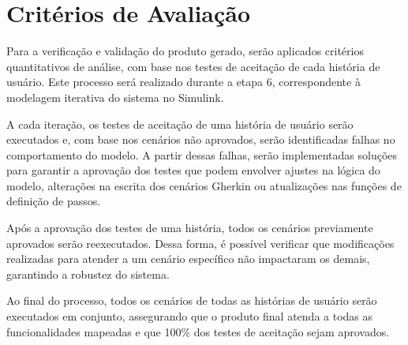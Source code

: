 \section{\textbf{Critérios de Avaliação}}
Para a verificação e validação do produto gerado, serão aplicados critérios quantitativos de análise, com base nos testes de aceitação de cada história de usuário. Este 
processo será realizado durante a etapa 6, correspondente à modelagem iterativa do sistema no Simulink.

A cada iteração, os testes de aceitação de uma história de usuário serão executados e, com base nos cenários não aprovados, serão identificadas falhas no comportamento 
do modelo. A partir dessas falhas, serão implementadas soluções para garantir a aprovação dos testes que podem envolver ajustes na lógica do modelo, 
alterações na escrita dos cenários Gherkin ou atualizações nas funções de definição de passos.

Após a aprovação dos testes de uma história, todos os cenários previamente aprovados serão reexecutados. Dessa forma, é possível verificar que modificações realizadas 
para atender a um cenário específico não impactaram os demais, garantindo a robustez do sistema.

Ao final do processo, todos os cenários de todas as histórias de usuário serão executados em conjunto, assegurando que o produto final atenda a todas as funcionalidades 
mapeadas e que 100\% dos testes de aceitação sejam aprovados.




